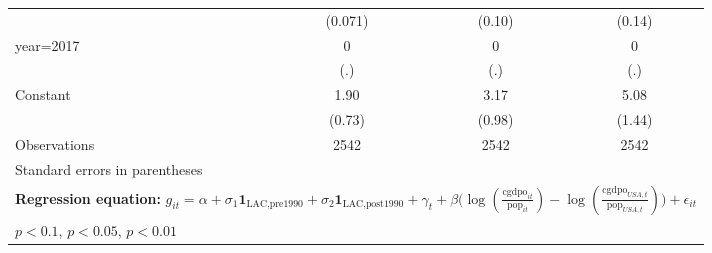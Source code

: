 \begin{sidewaystable}[htbp]
\begin{tabular}{l*{3}{c}}
                &  (0.071)         &   (0.10)         &   (0.14)         \\
\addlinespace
year=2017       &        0         &        0         &        0         \\
                &      (.)         &      (.)         &      (.)         \\
\addlinespace
Constant        &     1.90\sym{**} &     3.17\sym{***}&     5.08\sym{***}\\
                &   (0.73)         &   (0.98)         &   (1.44)         \\
\midrule
Observations    &     2542         &     2542         &     2542         \\
\bottomrule
\multicolumn{4}{l}{\footnotesize Standard errors in parentheses}\\
\multicolumn{4}{l}{\footnotesize \textbf{Regression equation:} \(g_{it} = \alpha + \sigma_1 \mathbf{1}_{\textrm{LAC,pre1990}} + \sigma_2 \mathbf{1}_{\textrm{LAC,post1990}} + \gamma_t + \beta \big(\log (\frac{\textrm{cgdpo}_{it}}{\textrm{pop}_{it}} ) - \log (\frac{\textrm{cgdpo}_{USA,t}}{\textrm{pop}_{USA,t}}  ) \big) + \epsilon_{it}\)}\\
\multicolumn{4}{l}{\footnotesize \sym{*} \(p<0.1\), \sym{**} \(p<0.05\), \sym{***} \(p<0.01\)}\\
\end{tabular}
\end{sidewaystable}
